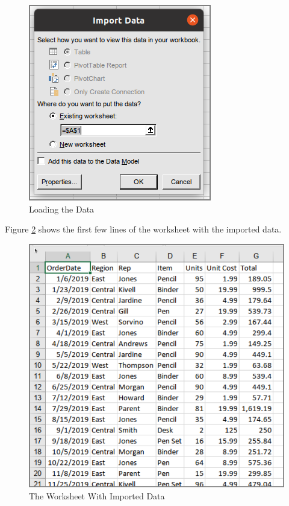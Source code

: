 \begin{figure}[H]
	\centering
	\includegraphics[width=\maxwidth{.95\linewidth}]{gfx/ch07_fig09}
	\caption{Loading the Data}
	\label{07:fig09}
\end{figure}

Figure \ref{07:fig10} shows the first few lines of the worksheet with the imported data.

\begin{figure}[H]
	\centering
	\includegraphics[width=\maxwidth{.95\linewidth}]{gfx/ch07_fig10}
	\caption{The Worksheet With Imported Data}
	\label{07:fig10}
\end{figure}


